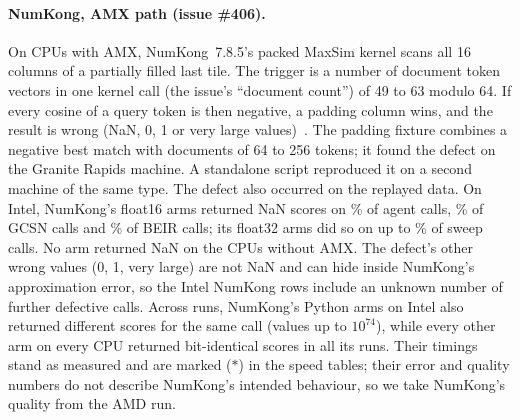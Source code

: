 \paragraph{NumKong, AMX path (issue \#406).}
On CPUs with AMX, NumKong~7.8.5's packed MaxSim kernel scans all 16 columns of a partially filled last tile.
The trigger is a number of document token vectors in one kernel call (the issue's ``document count'') of 49 to 63 modulo 64.
If every cosine of a query token is then negative, a padding column wins, and the result is wrong (NaN, 0, 1 or very large values)~\cite{numkong_issue406}.
The padding fixture combines a negative best match with documents of 64 to 256 tokens; it found the defect on the Granite Rapids machine.
A standalone script reproduced it on a second machine of the same type.
The defect also occurred on the replayed data. On Intel, NumKong's float16 arms returned NaN scores on \% of agent calls, \% of GCSN calls and \% of BEIR calls; its float32 arms did so on up to \% of sweep calls. No arm returned NaN on the CPUs without AMX. The defect's other wrong values (0, 1, very large) are not NaN and can hide inside NumKong's approximation error, so the Intel NumKong rows include an unknown number of further defective calls. Across runs, NumKong's Python arms on Intel also returned different scores for the same call (values up to $10^{74}$), while every other arm on every CPU returned bit-identical scores in all its runs. Their timings stand as measured and are marked ($\ast$) in the speed tables; their error and quality numbers do not describe NumKong's intended behaviour, so we take NumKong's quality from the AMD run.

